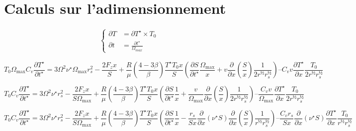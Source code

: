\section{Calculs sur l’adimensionnement}

\begin{align}
    \left\{
        \begin{aligned}
            \partial T &= \partial T^{\star} × T_0 \\
            \partial t &= \frac{\partial t^{\star}}{\Omega_{max}}
        \end{aligned}
    \right.
\end{align}

\begin{equation}
    T_0 \Omega_\mathrm{max} C_v \frac{\partial T^{\star}}{\partial t^{\star}} =
    3 \Omega^2 \nu^\star \Omega_\mathrm{max} r_s^2 − \frac{2 F_z x}{S} +
    \frac{R}{\mu} \left(\frac{4−3\beta}{\beta}\right) \frac{T^\star T_0 x}{S}
    \left( \frac{\partial S}{\partial t^\star} \frac{\Omega_\mathrm{max}}{x} + v \frac{\partial}{\partial x} \left(\frac{S}{x}\right) \frac{1}{2 r^½ r_s^½}  \right) –
    C_v v \frac{\partial T^\star}{\partial x} \frac{T_0}{2 r^½ r_s^½}
\end{equation}

\begin{equation}
    T_0 C_v \frac{\partial T^{\star}}{\partial t^{\star}} =
    3 \Omega^2 \nu^\star r_s^2 − \frac{2 F_z x}{S \Omega_\mathrm{max}} +
    \frac{R}{\mu} \left(\frac{4−3\beta}{\beta}\right) \frac{T^\star T_0 x}{S}
    \left( \frac{\partial S}{\partial t^\star} \frac{1}{x} + \frac{v}{\Omega_\mathrm{max}} \frac{\partial}{\partial x} \left(\frac{S}{x}\right) \frac{1}{2 r^½ r_s^½}  \right) –
    \frac{C_v v}{\Omega_\mathrm{max}} \frac{\partial T^\star}{\partial x} \frac{T_0}{2 r^½ r_s^½}
\end{equation}

\begin{equation}
    T_0 C_v \frac{\partial T^{\star}}{\partial t^{\star}} =
    3 \Omega^2 \nu^\star r_s^2 − \frac{2 F_z x}{S \Omega_\mathrm{max}} +
    \frac{R}{\mu} \left(\frac{4−3\beta}{\beta}\right) \frac{T^\star T_0 x}{S}
    \left( \frac{\partial S}{\partial t^\star} \frac{1}{x} − \frac{r_s}{S x} \frac{\partial}{\partial x} \left(\nu^\star S\right) \frac{\partial}{\partial x} \left(\frac{S}{x}\right) \frac{1}{r^½ r_s^½}  \right) –
    \frac{C_v r_s}{S x} \frac{\partial}{\partial x} \left(\nu^\star S\right) \frac{\partial T^\star}{\partial x} \frac{T_0}{r^½ r_s^½}
\end{equation}

